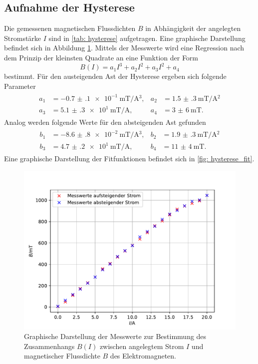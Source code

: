 \subsection{Aufnahme der Hysterese}
Die gemessenen magnetischen Flussdichten $B$ in Abhängigkeit der angelegten Stromstärke $I$
sind in \autoref{tab: hysterese} aufgetragen. Eine graphische Darstellung befindet sich in Abbildung
\ref{fig: hysterese_gesamt}. Mittels der Messwerte wird eine Regression nach dem Prinzip der kleinsten Quadrate
an eine Funktion der Form
\begin{equation}
  B(I) = a_1 I^3 + a_2 I^2 + a_3 I ^2 + a_4
  \label{eq: fitfuntion_hysterese}
\end{equation}
bestimmt. Für den austeigenden Ast der Hysterese ergeben sich folgende Parameter
\begin{align}
  \begin{aligned}
    a_1 &= \SI{-0.7(1)e-1}{\milli\tesla \per \ampere ^3}, & a_2 &= \SI{1.5(3)}{\milli\tesla \per \ampere ^2} \\ %
    a_3 &= \SI{5.1(3)e1}{\milli\tesla \per \ampere }, & a_4 &= \SI{3(6)}{\milli\tesla }.
    \label{eq: params_up}
  \end{aligned}
\end{align}
Analog werden folgende Werte für den absteigenden Ast gefunden
\begin{align}
  \begin{aligned}
    b_1 &= \SI{-8.6(8)e-2}{\milli\tesla \per \ampere ^3}, & b_2 &= \SI{1.9(3)}{\milli\tesla \per \ampere ^2} \\
    b_3 &= \SI{4.7(2)e1}{\milli\tesla \per \ampere }, & b_4 &= \SI{11(4)}{\milli\tesla }.
  \end{aligned}
\end{align}
Eine graphische Darstellung der Fitfunktionen befindet sich in \autoref{fig: hysterese_fit}.

\begin{figure}
  \centering
  \includegraphics[width = \textwidth]{../Messdaten/plots/hysterese_data.pdf}
  \caption{Graphische Darstellung der Messwerte zur Bestimmung des Zusammenhangs $B(I)$ zwischen angelegtem Strom $I$ und
  magnetischer Flussdichte $B$ des Elektromagneten.}
  \label{fig: hysterese_gesamt}
\end{figure}
